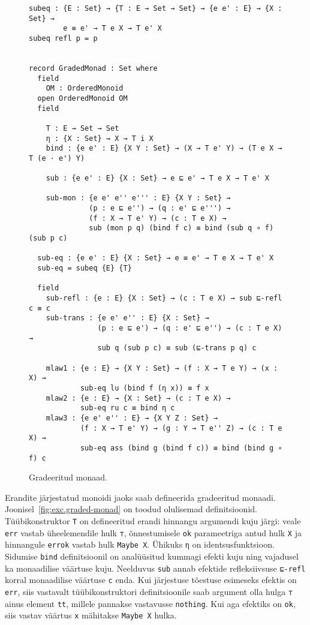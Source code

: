 \documentclass[a4paper,12pt]{article}
\begin{document}
\begin{figure}
  \begin{BVerbatim}
subeq : {E : Set} → {T : E → Set → Set} → {e e' : E} → {X : Set} →
        e ≡ e' → T e X → T e' X
subeq refl p = p


record GradedMonad : Set where
  field
    OM : OrderedMonoid
  open OrderedMonoid OM
  field

    T : E → Set → Set
    η : {X : Set} → X → T i X
    bind : {e e' : E} {X Y : Set} → (X → T e' Y) → (T e X → T (e · e') Y)

    sub : {e e' : E} {X : Set} → e ⊑ e' → T e X → T e' X

    sub-mon : {e e' e'' e''' : E} {X Y : Set} →
              (p : e ⊑ e'') → (q : e' ⊑ e''') → 
              (f : X → T e' Y) → (c : T e X) → 
              sub (mon p q) (bind f c) ≡ bind (sub q ∘ f) (sub p c) 

  sub-eq : {e e' : E} {X : Set} → e ≡ e' → T e X → T e' X
  sub-eq = subeq {E} {T}
 
  field
    sub-refl : {e : E} {X : Set} → (c : T e X) → sub ⊑-refl c ≡ c
    sub-trans : {e e' e'' : E} {X : Set} →
                (p : e ⊑ e') → (q : e' ⊑ e'') → (c : T e X) → 
                sub q (sub p c) ≡ sub (⊑-trans p q) c   

    mlaw1 : {e : E} → {X Y : Set} → (f : X → T e Y) → (x : X) →
            sub-eq lu (bind f (η x)) ≡ f x
    mlaw2 : {e : E} → {X : Set} → (c : T e X) →
            sub-eq ru c ≡ bind η c
    mlaw3 : {e e' e'' : E} → {X Y Z : Set} →
            (f : X → T e' Y) → (g : Y → T e'' Z) → (c : T e X) → 
            sub-eq ass (bind g (bind f c)) ≡ bind (bind g ∘ f) c 
  \end{BVerbatim}
  \caption{Gradeeritud monaad.}
  \label{fig:graded-monad}
\end{figure}

Erandite järjestatud monoidi jaoks saab defineerida gradeeritud monaadi. Joonisel~\ref{fig:exc.graded-monad} on toodud olulisemad definitsioonid.
Tüübikonstruktor {\tt T} on defineeritud erandi hinnangu argumendi kuju järgi: veale {\tt err} vastab üheelemendile hulk {\tt ⊤}, õnnestumisele {\tt ok} parameetriga antud hulk {\tt X} ja hinnangule {\tt errok} vastab hulk {\tt Maybe X}.
Ühikuks {\tt η} on identsusfunktsioon.
Sidumise {\tt bind} definitsioonil on analüüsitud kummagi efekti kuju ning vajadusel ka monaadilise väärtuse kuju.
Neelduvus {\tt sub} annab efektide refleksiivsuse {\tt ⊑-refl} korral monaadilise väärtuse {\tt c} enda.
Kui järjestuse tõestuse esimeseks efektis on {\tt err}, siis vastavalt tüübikonstruktori definitsioonile saab argument olla hulga {\tt ⊤} ainus element {\tt tt}, millele pannakse vastavusse {\tt nothing}.
Kui aga efektiks on {\tt ok}, siis vastav väärtus {\tt x} mähitakse {\tt Maybe X} hulka.
\end{document}
